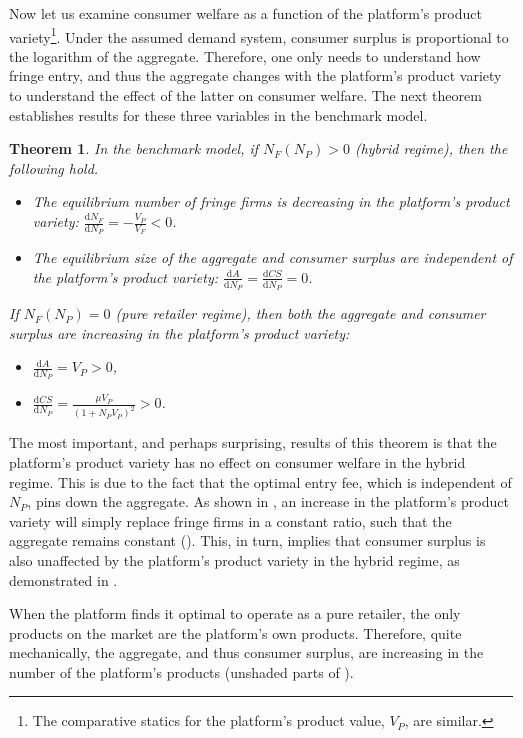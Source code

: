 \documentclass[a4paper]{article}
\newtheorem{theorem}{Theorem}
\newcommand{\dd}{\mathrm{d}}
\begin{document}
Now let us examine consumer welfare as a function of the platform's product variety\footnote{
    The comparative statics for the platform's product value, $V_P$, are similar.
}.
Under the assumed demand system, consumer surplus is proportional to the logarithm of the aggregate.
Therefore, one only needs to understand how fringe entry, and thus the aggregate changes with the platform's product variety to understand the effect of the latter on consumer welfare.
The next theorem establishes results for these three variables in the benchmark model.
\begin{theorem}
    \label{prop:equilibrium_benchmark}
    In the benchmark model, if $N_F(N_P) > 0$ (hybrid regime), then the following hold.
    \begin{itemize}
        \item The equilibrium number of fringe firms is decreasing in the platform's product variety: $\frac{\dd N_F}{\dd N_P} = -\frac{V_P}{V_F} < 0$.
        \item The equilibrium size of the aggregate and consumer surplus are independent of the platform's product variety: $\frac{\dd A}{\dd N_P} = \frac{\dd CS}{\dd N_P} = 0$.
    \end{itemize}
    If $N_F(N_P) = 0$ (pure retailer regime), then both the aggregate and consumer surplus are increasing in the platform's product variety:
    \begin{itemize}
        \item $\frac{\dd A}{\dd N_P} = V_P > 0$,
        \item $\frac{\dd CS}{\dd N_P} = \frac{\mu V_P}{(1 + N_P V_P)^2} > 0$.
    \end{itemize}
\end{theorem}

The most important, and perhaps surprising, results of this theorem is that the platform's product variety has no effect on consumer welfare in the hybrid regime.
This is due to the fact that the optimal entry fee, which is independent of $N_P$, pins down the aggregate.
As shown in , an increase in the platform's product variety will simply replace fringe firms in a constant ratio, such that the aggregate remains constant ().
This, in turn, implies that consumer surplus is also unaffected by the platform's product variety in the hybrid regime, as demonstrated in .

When the platform finds it optimal to operate as a pure retailer, the only products on the market are the platform's own products.
Therefore, quite mechanically, the aggregate, and thus consumer surplus, are increasing in the number of the platform's products (unshaded parts of ).
\end{document}

